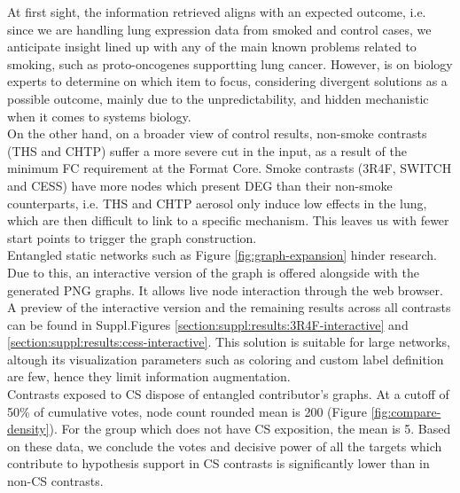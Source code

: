 At first sight, the information retrieved aligns with an expected outcome, i.e. since we are handling lung expression data from smoked and control cases, we anticipate insight lined up with any of the main known problems related to smoking, such as proto-oncogenes supportting lung cancer. However, is on biology experts to determine on which item to focus, considering divergent solutions as a possible outcome, mainly due to the unpredictability, and hidden mechanistic when it comes to systems biology.
\\

On the other hand, on a broader view of control results, non-smoke contrasts (THS and  CHTP) suffer a more severe cut in the input, as a result of the minimum FC requirement at the Format Core. Smoke contrasts (3R4F, SWITCH and CESS) have more nodes which present DEG than their non-smoke counterparts, i.e. THS and CHTP aerosol only induce low effects in the lung, which are then difficult to link to a specific mechanism. This leaves us with fewer start points to trigger the graph construction.
\\

Entangled static networks such as Figure \ref{fig:graph-expansion} hinder research. Due to this, an interactive version of the graph is offered alongside with the generated PNG graphs. It allows live node interaction through the web browser. A preview of the interactive version and the remaining results across all contrasts can be found in Suppl.Figures \ref{section:suppl:results:3R4F-interactive} and \ref{section:suppl:results:cess-interactive}. This solution is suitable for large networks, altough its visualization parameters such as coloring and custom label definition are few, hence they limit information augmentation.
\\

Contrasts exposed to CS dispose of entangled contributor’s graphs. At a cutoff of 50\% of cumulative votes, node count rounded mean is 200 (Figure \ref{fig:compare-density}). For the group which does not have CS exposition, the mean is 5. Based on these data, we conclude the votes and decisive power of all the targets which contribute to hypothesis support in CS contrasts is significantly lower than in non-CS contrasts.
\\

